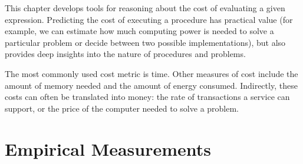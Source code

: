 \begin{schemeregion}

This chapter develops tools for reasoning about the cost of evaluating a given expression.  Predicting the cost of executing a procedure has practical value (for example, we can estimate how much computing power is needed to solve a particular problem or decide between two possible implementations), but also provides deep insights into the nature of procedures and problems.

The most commonly used cost metric is time.  Other measures of cost include the amount of memory needed and the amount of energy consumed.  Indirectly, these costs can often be translated into money: the rate of transactions a service can support, or the price of the computer needed to solve a problem.  


\section{Empirical Measurements}\label{sec:measuringcost}


\end{schemeregion}
